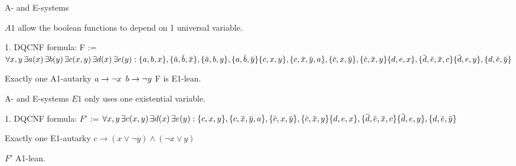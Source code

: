 \documentclass[xcolor=table	]{beamer}
\newcommand{\ov}[1]{\mkern 1.5mu\overline{\mkern-1.5mu#1\mkern-1.5mu}\mkern 1.5mu}
\begin{document}
\begin{frame}{A- and E-systems}

\vspace{0.2cm}
\only
 $A1$ allow the boolean functions to  
	depend on 1 universal variable. 
	
	\begin{alertblock}{1. DQCNF formula:}
		{		
		F :=	$ \forall x, y \, \exists a(x) \, \exists  b(y) \, \exists c(x,y) \, \exists d(x) \, \exists e(y) :
			\{a,b,x\}, \{\ov{a},\ov{b},\ov{x}\}, \{\ov{a},b,y\}, \{a,\ov{b},\ov{y}\}  \newline 
			\{c,x,y\}, \{c,\ov{x},\ov{y}, a\}, \{\ov{c},x,\ov{y}\}, \{\ov{c},\ov{x},y\} \newline 
			\{d,e,x\}, \{\ov{d},\ov{e},\ov{x}, c\} \{\ov{d},e,y\}, \{d,\ov{e},\ov{y}\} $
		}
	\end{alertblock}
    
    \begin{example}
    	Exactly one A1-autarky \newline 
    	 $a \to \neg x \newline$ 
    	 $b \to \neg y \newline$
    	 F is E1-lean.
    	 
    \end{example}
\end{frame}
    
\begin{frame}{A- and E-systems}
$E1$ only uses one existential variable. 
\begin{alertblock}{1. DQCNF formula:}
	{		
		$F'$ :=	$ \forall x, y \, \exists c(x,y) \, \exists d(x) \, \exists e(y) : \newline 
		\{c,x,y\}, \{c,\ov{x},\ov{y}, a\}, \{\ov{c},x,\ov{y}\}, \{\ov{c},\ov{x},y\} \newline 
		\{d,e,x\}, \{\ov{d},\ov{e},\ov{x}, c\} \{\ov{d},e,y\}, \{d,\ov{e},\ov{y}\} $
	}
\end{alertblock}

 \begin{example}
	Exactly one E1-autarky \newline 
	$c \to (x \lor \neg y) \land (\neg x \lor y)$
	
	$F'$ A1-lean.
	
\end{example} 

\end{frame}
\end{document}
